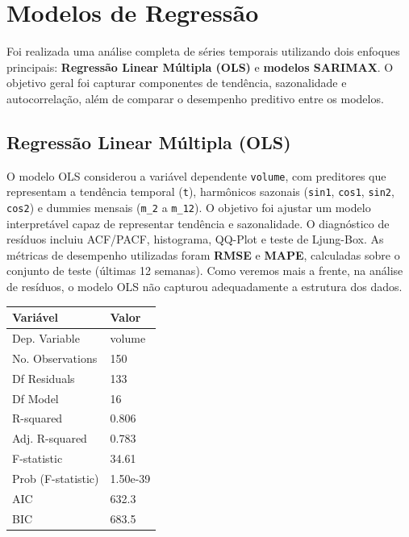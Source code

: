 \documentclass{article}
\begin{document}
\section*{Modelos de Regressão}

Foi realizada uma análise completa de séries temporais utilizando dois enfoques principais: \textbf{Regressão Linear Múltipla (OLS)} e \textbf{modelos SARIMAX}. O objetivo geral foi capturar componentes de tendência, sazonalidade e autocorrelação, além de comparar o desempenho preditivo entre os modelos.

\subsection*{Regressão Linear Múltipla (OLS)}
O modelo OLS considerou a variável dependente \texttt{volume}, com preditores que representam a tendência temporal (\texttt{t}), harmônicos sazonais (\texttt{sin1}, \texttt{cos1}, \texttt{sin2}, \texttt{cos2}) e dummies mensais (\texttt{m\_2} a \texttt{m\_12}).  
O objetivo foi ajustar um modelo interpretável capaz de representar tendência e sazonalidade. O diagnóstico de resíduos incluiu ACF/PACF, histograma, QQ-Plot e teste de Ljung-Box. As métricas de desempenho utilizadas foram \textbf{RMSE} e \textbf{MAPE}, calculadas sobre o conjunto de teste (últimas 12 semanas). Como veremos mais a frente, na análise de resíduos, o modelo OLS não capturou adequadamente a estrutura dos dados.

\begin{table}[h!]
\centering
\begin{tabular}{ll}
\hline
\textbf{Variável} & \textbf{Valor} \\
\hline
Dep. Variable       & volume \\
No. Observations    & 150 \\
Df Residuals        & 133 \\
Df Model            & 16 \\
R-squared           & 0.806 \\
Adj. R-squared      & 0.783 \\
F-statistic         & 34.61 \\
Prob (F-statistic)  & 1.50e-39 \\
AIC                 & 632.3 \\
BIC                 & 683.5 \\
\hline
\end{tabular}
\end{table}
\end{document}
